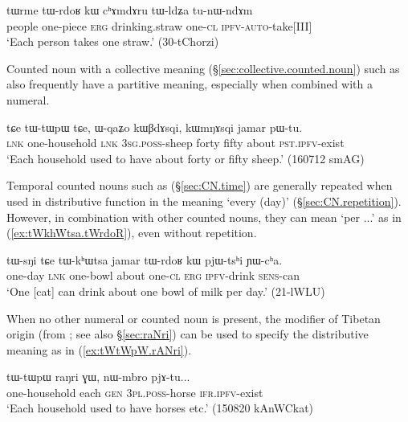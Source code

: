 \begin{exe}
	\ex \label{ex:tWrme.tWrdoR2}
	\gll tɯrme tɯ-rdoʁ kɯ cʰɤmdɤru tɯ-ldʑa tu-nɯ-ndɤm  \\
	people one-piece \textsc{erg} drinking.straw one-\textsc{cl} \textsc{ipfv}-\textsc{auto}-take[III] \\
	\glt `Each person takes one straw.' (30-tChorzi)
\end{exe}
 

Counted noun with a collective meaning (§\ref{sec:collective.counted.noun}) such as  also frequently have a partitive meaning, especially when combined with a numeral.

\begin{exe}
	\ex \label{ex:tWtWpW.tCe}
	\gll tɕe tɯ-tɯpɯ tɕe, ɯ-qaʑo kɯβdɤsqi, kɯmŋɤsqi jamar pɯ-tu. \\
	\textsc{lnk} one-household \textsc{lnk} \textsc{3sg}.\textsc{poss}-sheep forty fifty about \textsc{pst}.\textsc{ipfv}-exist \\
	\glt `Each household used to have about forty or fifty sheep.' (160712 smAG)
\end{exe} 


Temporal counted nouns such as  (§\ref{sec:CN.time}) are generally repeated when used in distributive function in the meaning `every (day)' (§\ref{sec:CN.repetition}). However, in combination with other counted nouns, they can mean `per ...' as in (\ref{ex:tWkhWtsa.tWrdoR}), even without repetition.

\begin{exe}
	\ex \label{ex:tWkhWtsa.tWrdoR}
	\gll tɯ-sŋi tɕe tɯ-kʰɯtsa jamar tɯ-rdoʁ kɯ pjɯ-tsʰi ɲɯ-cʰa. \\
	one-day \textsc{lnk} one-bowl about one-\textsc{cl} \textsc{erg} \textsc{ipfv}-drink \textsc{sens}-can \\
	\glt `One [cat] can drink about one bowl of milk per day.' (21-lWLU)
\end{exe}

When no other numeral or counted noun is present, the modifier of Tibetan origin  (from ; see also §\ref{sec:raNri}) can be used to specify the distributive meaning as in (\ref{ex:tWtWpW.rANri}).

\begin{exe}
	\ex \label{ex:tWtWpW.rANri}
	\gll tɯ-tɯpɯ raŋri ɣɯ, nɯ-mbro pjɤ-tu... \\
	one-household  each \textsc{gen} \textsc{3pl}.\textsc{poss}-horse \textsc{ifr}.\textsc{ipfv}-exist \\
	\glt `Each household used to have horses etc.' (150820 kAnWCkat)
\end{exe} 

